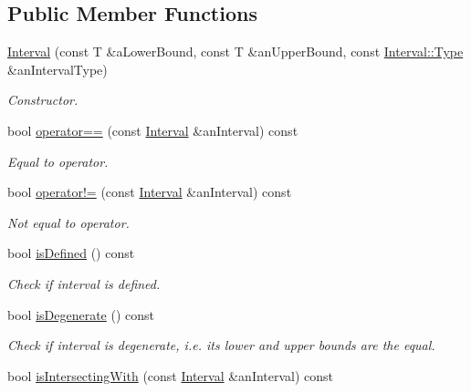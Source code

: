 \subsection*{Public Member Functions}
\begin{DoxyCompactItemize}
\item 
\hyperlink{classlibrary_1_1math_1_1obj_1_1_interval_ad3c3506ca4e90506ab1ea25a18fc5cd7}{Interval} (const T \&a\+Lower\+Bound, const T \&an\+Upper\+Bound, const \hyperlink{classlibrary_1_1math_1_1obj_1_1_interval_abc7177f1c446d8273e70c989953667d1}{Interval\+::\+Type} \&an\+Interval\+Type)
\begin{DoxyCompactList}\small\item\em Constructor. \end{DoxyCompactList}\item 
bool \hyperlink{classlibrary_1_1math_1_1obj_1_1_interval_a99b12768e33b75bf87ab656b92c03e98}{operator==} (const \hyperlink{classlibrary_1_1math_1_1obj_1_1_interval}{Interval} \&an\+Interval) const
\begin{DoxyCompactList}\small\item\em Equal to operator. \end{DoxyCompactList}\item 
bool \hyperlink{classlibrary_1_1math_1_1obj_1_1_interval_a5ca4c08ba0aff1ea42ea3804d51e02cf}{operator!=} (const \hyperlink{classlibrary_1_1math_1_1obj_1_1_interval}{Interval} \&an\+Interval) const
\begin{DoxyCompactList}\small\item\em Not equal to operator. \end{DoxyCompactList}\item 
bool \hyperlink{classlibrary_1_1math_1_1obj_1_1_interval_a2de37bb9d7b97ae7892188c26c99b6fb}{is\+Defined} () const
\begin{DoxyCompactList}\small\item\em Check if interval is defined. \end{DoxyCompactList}\item 
bool \hyperlink{classlibrary_1_1math_1_1obj_1_1_interval_a0e9997639f0c415f4f7fe8dcb58e13a8}{is\+Degenerate} () const
\begin{DoxyCompactList}\small\item\em Check if interval is degenerate, i.\+e. its lower and upper bounds are the equal. \end{DoxyCompactList}\item 
bool \hyperlink{classlibrary_1_1math_1_1obj_1_1_interval_a5c02f1b4c3a6913a2eb0893d5c3b9925}{is\+Intersecting\+With} (const \hyperlink{classlibrary_1_1math_1_1obj_1_1_interval}{Interval} \&an\+Interval) const

\end{DoxyCompactItemize}
